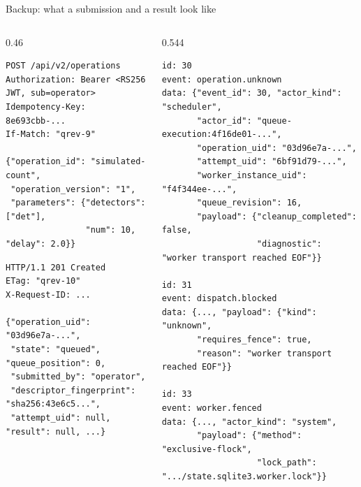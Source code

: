 \begin{frame}[fragile]{Backup: what a submission and a result look like}
    \begin{columns}[T]
        \begin{column}{0.46\textwidth}
\begin{lstlisting}[style=http, basicstyle=\ttfamily\tiny]
POST /api/v2/operations
Authorization: Bearer <RS256 JWT, sub=operator>
Idempotency-Key: 8e693cbb-...
If-Match: "qrev-9"

{"operation_id": "simulated-count",
 "operation_version": "1",
 "parameters": {"detectors": ["det"],
                "num": 10, "delay": 2.0}}
\end{lstlisting}
\begin{lstlisting}[style=http, basicstyle=\ttfamily\tiny]
HTTP/1.1 201 Created
ETag: "qrev-10"
X-Request-ID: ...

{"operation_uid": "03d96e7a-...",
 "state": "queued", "queue_position": 0,
 "submitted_by": "operator",
 "descriptor_fingerprint": "sha256:43e6c5...",
 "attempt_uid": null, "result": null, ...}
\end{lstlisting}
        \end{column}
        \begin{column}{0.544\textwidth}
\begin{lstlisting}[style=http, basicstyle=\ttfamily\tiny]
id: 30
event: operation.unknown
data: {"event_id": 30, "actor_kind": "scheduler",
       "actor_id": "queue-execution:4f16de01-...",
       "operation_uid": "03d96e7a-...",
       "attempt_uid": "6bf91d79-...",
       "worker_instance_uid": "f4f344ee-...",
       "queue_revision": 16,
       "payload": {"cleanup_completed": false,
                   "diagnostic": "worker transport reached EOF"}}

id: 31
event: dispatch.blocked
data: {..., "payload": {"kind": "unknown",
       "requires_fence": true,
       "reason": "worker transport reached EOF"}}

id: 33
event: worker.fenced
data: {..., "actor_kind": "system",
       "payload": {"method": "exclusive-flock",
                   "lock_path": ".../state.sqlite3.worker.lock"}}
\end{lstlisting}
        \end{column}
    \end{columns}
\end{frame}
